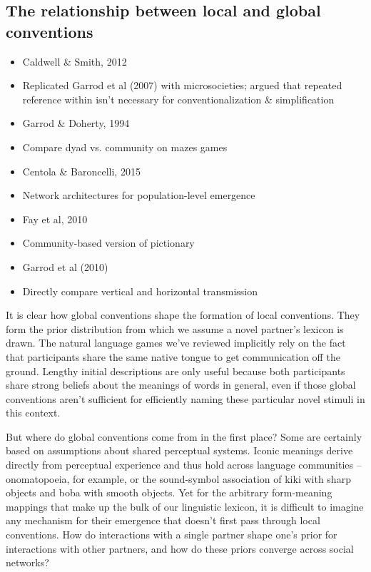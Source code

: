 \documentclass[11pt, floatsintext, jou]{apa6}
\begin{document}

\subsection{The relationship between local and global conventions}

\begin{itemize}
\item Caldwell \& Smith, 2012
\item Replicated Garrod et al (2007) with microsocieties; argued that repeated reference within isn't necessary for conventionalization \& simplification
\item Garrod \& Doherty, 1994
\item Compare dyad vs. community on mazes games
\item Centola \& Baroncelli, 2015
\item Network architectures for population-level emergence
\item Fay et al, 2010 
\item Community-based version of pictionary
\item Garrod et al (2010)
\item Directly compare vertical and horizontal transmission
\end{itemize}

It is clear how global conventions shape the formation of local conventions. They form the prior distribution from which we assume a novel partner's lexicon is drawn. The natural language games we've reviewed %
implicitly rely on the fact that participants share the same native tongue to get communication off the ground. Lengthy initial descriptions are only useful because both participants share strong beliefs about the meanings of words in general, even if those global conventions aren't sufficient for efficiently naming these particular novel stimuli in this context. 

But where do global conventions come from in the first place? Some are certainly based on assumptions about shared perceptual systems. Iconic meanings derive directly from perceptual experience and thus hold across language communities -- onomatopoeia, for example, or the sound-symbol association of kiki with sharp objects and boba with smooth objects. Yet for the arbitrary form-meaning mappings that make up the bulk of our linguistic lexicon, it is difficult to imagine any mechanism for their emergence that doesn't first pass through local conventions. How do interactions with a single partner shape one's prior for interactions with other partners, and how do these priors converge across social networks? 
\end{document}
